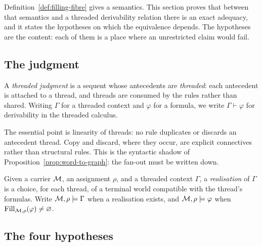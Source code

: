 \label{sec:adequacy-body}

Definition~\ref{def:filling-fibre} gives a semantics.  This section proves that between
that semantics and a threaded derivability relation there is an exact adequacy, and it
states the hypotheses on which the equivalence depends.  The hypotheses are the content:
each of them is a place where an unrestricted claim would fail.

\subsection{The judgment}

\begin{definition}\label{def:threaded-judgment}
A \emph{threaded judgment} is a sequent whose antecedents are \emph{threaded}: each
antecedent is attached to a thread, and threads are consumed by the rules rather than
shared.  Writing $\Gamma$ for a threaded context and $\varphi$ for a formula, we write
$\Gamma\vdash\varphi$ for derivability in the threaded calculus.
\end{definition}

The essential point is linearity of threads: no rule duplicates or discards an antecedent
thread.  Copy and discard, where they occur, are explicit connectives rather than
structural rules.  This is the syntactic shadow of
Proposition~\ref{prop:word-to-graph}: the fan-out must be written down.

\begin{definition}[Realisation]\label{def:realisation}
Given a carrier $\mathcal M$, an assignment $\rho$, and a threaded context $\Gamma$, a
\emph{realisation} of $\Gamma$ is a choice, for each thread, of a terminal world
compatible with the thread's formulas.  Write $\mathcal M,\rho\models\Gamma$ when a realisation
exists, and $\mathcal M,\rho\models\varphi$ when
$\operatorname{Fill}_{\mathcal M,\rho}(\varphi)\neq\varnothing$.
\end{definition}

\subsection{The four hypotheses}

